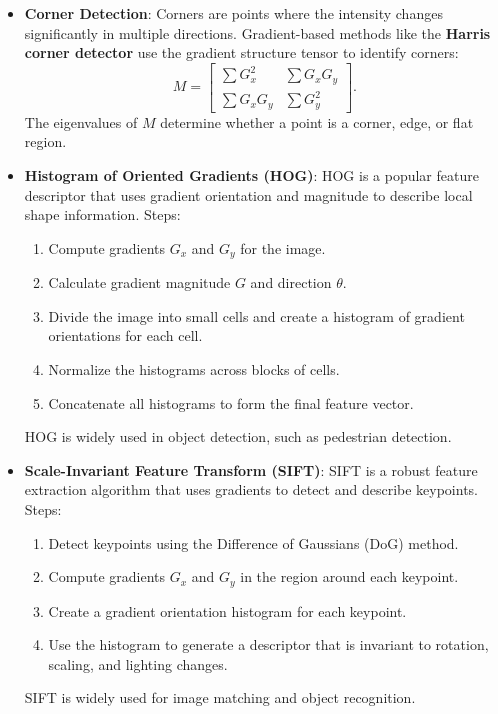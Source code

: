 \begin{notechapter}
\begin{itemize}
    \item \textbf{Corner Detection}:
        Corners are points where the intensity changes significantly
        in multiple directions. Gradient-based methods like the
        \textbf{Harris corner detector} use the gradient structure
        tensor to identify corners:
        \[
        M = \begin{bmatrix}
        \sum G_x^2 & \sum G_x G_y \\
        \sum G_x G_y & \sum G_y^2
        \end{bmatrix}.
        \]
        The eigenvalues of $M$ determine whether a point is a corner,
        edge, or flat region.

    \item \textbf{Histogram of Oriented Gradients (HOG)}:
        HOG is a popular feature descriptor that uses gradient
        orientation and magnitude to describe local shape information.
        Steps:
        \begin{enumerate}
            \item Compute gradients $G_x$ and $G_y$ for the image.
            \item Calculate gradient magnitude $G$ and direction $\theta$.
            \item Divide the image into small cells and create a histogram
                  of gradient orientations for each cell.
            \item Normalize the histograms across blocks of cells.
            \item Concatenate all histograms to form the final feature vector.
        \end{enumerate}
        HOG is widely used in object detection, such as pedestrian detection.

    \item \textbf{Scale-Invariant Feature Transform (SIFT)}:
        SIFT is a robust feature extraction algorithm that uses gradients
        to detect and describe keypoints. Steps:
        \begin{enumerate}
            \item Detect keypoints using the Difference of Gaussians (DoG) method.
            \item Compute gradients $G_x$ and $G_y$ in the region around each keypoint.
            \item Create a gradient orientation histogram for each keypoint.
            \item Use the histogram to generate a descriptor that is invariant
                  to rotation, scaling, and lighting changes.
        \end{enumerate}
        SIFT is widely used for image matching and object recognition.


\end{itemize}
\end{notechapter}
